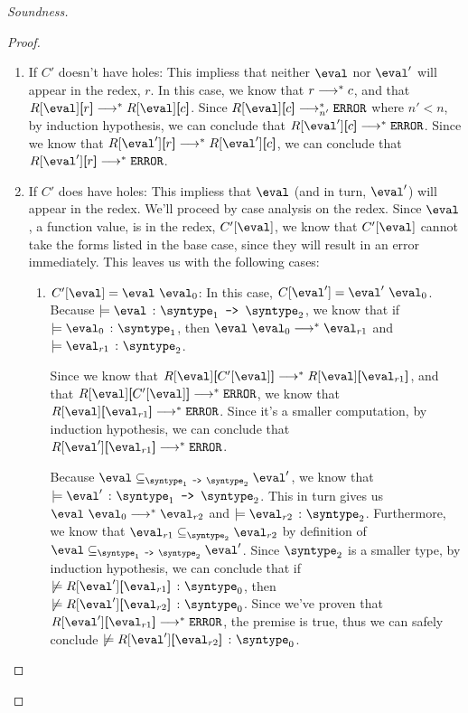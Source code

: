 \begin{proof}[Soundness]
\begin{proof}
    \begin{enumerate}
      \item If $C'$ doesn't have holes: This impliess that neither $\eval$ nor $\eval'$ will appear in the redex, $r$. In this case, we know that $r \smallsteps[] c$, and that $\redcon{\eval}{r} \smallsteps[] \redcon{\eval}{c}$. Since $\redcon{\eval}{c} \smallsteps[n'] \eerror$ where $n' < n$, by induction hypothesis, we can conclude that $\redcon{\eval'}{c} \smallsteps[] \eerror$. Since we know that $\redcon{\eval'}{r} \smallsteps[] \redcon{\eval'}{c}$, we can conclude that $\redcon{\eval'}{r} \smallsteps[] \eerror$.
      \item If $C'$ does have holes: This impliess that $\eval$ (and in turn, $\eval'$) will appear in the redex. We'll proceed by case analysis on the redex. Since $\eval$, a function value, is in the redex, $C'[\eval]$, we know that $C'[\eval]$ cannot take the forms listed in the base case, since they will result in an error immediately. This leaves us with the following cases:
      \begin{enumerate}
        \item $C'[\eval] = \eval \ \eval_0$: In this case, $C[\eval'] = \eval' \ \eval_0$. Because $\models \hastype{\eval}{\mkfun{\syntype_1}{\syntype_2}}$, we know that if $\models \hastype{\eval_0}{\syntype_1}$, then $\eval \ \eval_0 \smallsteps[] \eval_{r1}$ and $\models \hastype{\eval_{r1}}{\syntype_2}$. 
        
        Since we know that $\redcon{\eval}{C'[\eval]} \smallsteps[] \redcon{\eval}{\eval_{r1}}$, and that $\redcon{\eval}{C'[\eval]} \smallsteps[] \eerror$, we know that 
        $\redcon{\eval}{\eval_{r1}} \smallsteps[] \eerror$. Since it's a smaller computation, by induction hypothesis, we can conclude that $\redcon{\eval'}{\eval_{r1}} \smallsteps[] \eerror$.

        Because $\eval \subseteq_{\mkfun{\syntype_1}{\syntype_2}} \eval'$, we know that $\models \hastype{\eval'}{\mkfun{\syntype_1}{\syntype_2}}$. This in turn gives us $\eval \ \eval_0 \smallsteps[] \eval_{r2}$ and $\models \hastype{\eval_{r2}}{\syntype_2}$. Furthermore, we know that $\eval_{r1} \subseteq_{\syntype_2} \eval_{r2}$ by definition of $\eval \subseteq_{\mkfun{\syntype_1}{\syntype_2}} \eval'$. Since $\syntype_2$ is a smaller type, by induction hypothesis, we can conclude that if $\not \models \hastype{\redcon{\eval'}{\eval_{r1}}}{\syntype_0}$, then $\not \models \hastype{\redcon{\eval'}{\eval_{r2}}}{\syntype_0}$. Since we've proven that $\redcon{\eval'}{\eval_{r1}} \smallsteps[] \eerror$, the premise is true, thus we can safely conclude $\not \models \hastype{\redcon{\eval'}{\eval_{r2}}}{\syntype_0}$.


\end{enumerate}
\end{enumerate}
\end{proof}
\end{proof}
